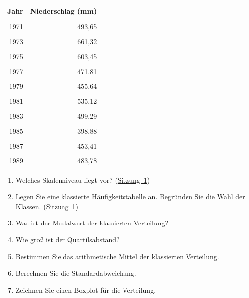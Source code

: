 \documentclass[
  11pt,
  ngerman,
  a4paper,
]{report}
\providecommand{\tightlist}{%
  \setlength{\itemsep}{0pt}\setlength{\parskip}{0pt}}
\begin{document}
\begin{table}
\centering
\begin{tabular}{rr}
\toprule
\textbf{Jahr} & \textbf{Niederschlag (mm)}\\
\midrule
\cellcolor{gray!6}{1970} & \cellcolor{gray!6}{384,52}\\
1971 & 493,65\\
\cellcolor{gray!6}{1972} & \cellcolor{gray!6}{364,65}\\
1973 & 661,32\\
\cellcolor{gray!6}{1974} & \cellcolor{gray!6}{785,27}\\
1975 & 603,45\\
\cellcolor{gray!6}{1976} & \cellcolor{gray!6}{527,75}\\
1977 & 471,81\\
\cellcolor{gray!6}{1978} & \cellcolor{gray!6}{525,65}\\
1979 & 455,64\\
\cellcolor{gray!6}{1980} & \cellcolor{gray!6}{433,01}\\
1981 & 535,12\\
\cellcolor{gray!6}{1982} & \cellcolor{gray!6}{421,36}\\
1983 & 499,29\\
\cellcolor{gray!6}{1984} & \cellcolor{gray!6}{555,21}\\
1985 & 398,88\\
\cellcolor{gray!6}{1986} & \cellcolor{gray!6}{391,96}\\
1987 & 453,41\\
\cellcolor{gray!6}{1988} & \cellcolor{gray!6}{459,84}\\
1989 & 483,78\\
\bottomrule
\end{tabular}
\end{table}

\begin{enumerate}
\def\labelenumi{\alph{enumi})}
\tightlist
\item
  Welches Skalenniveau liegt vor? (\protect\hyperlink{skalenniveaus}{Sitzung~1})
\item
  Legen Sie eine klassierte Häufigkeitstabelle an. Begründen Sie die Wahl der Klassen. (\protect\hyperlink{quantitative-variablen-1}{Sitzung~1})
\item
  Was ist der Modalwert der klassierten Verteilung?
\item
  Wie groß ist der Quartilsabstand?
\item
  Bestimmen Sie das arithmetische Mittel der klassierten Verteilung.
\item
  Berechnen Sie die Standardabweichung.
\item
  Zeichnen Sie einen Boxplot für die Verteilung.
\end{enumerate}
\end{document}

